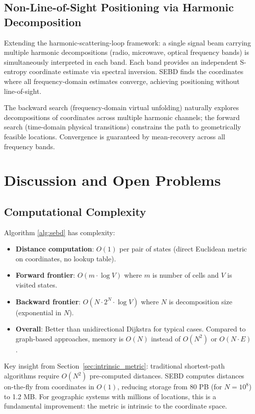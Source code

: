 \documentclass[twocolumn,11pt,a4paper]{article}
\begin{document}
\subsection{Non-Line-of-Sight Positioning via Harmonic Decomposition}

Extending the harmonic-scattering-loop framework: a single signal beam carrying multiple harmonic decompositions (radio, microwave, optical frequency bands) is simultaneously interpreted in each band. Each band provides an independent S-entropy coordinate estimate via spectral inversion. SEBD finds the coordinates where all frequency-domain estimates converge, achieving positioning without line-of-sight.

The backward search (frequency-domain virtual unfolding) naturally explores decompositions of coordinates across multiple harmonic channels; the forward search (time-domain physical transitions) constrains the path to geometrically feasible locations. Convergence is guaranteed by mean-recovery across all frequency bands.

\section{Discussion and Open Problems}
\label{sec:discussion}

\subsection{Computational Complexity}

Algorithm \ref{alg:sebd} has complexity:
\begin{itemize}[nosep,leftmargin=1em]
  \item \textbf{Distance computation}: $O(1)$ per pair of states (direct Euclidean metric on coordinates, no lookup table).
  \item \textbf{Forward frontier}: $O(m \cdot \log V)$ where $m$ is number of cells and $V$ is visited states.
  \item \textbf{Backward frontier}: $O(N \cdot 2^N \cdot \log V)$ where $N$ is decomposition size (exponential in $N$).
  \item \textbf{Overall}: Better than unidirectional Dijkstra for typical cases. Compared to graph-based approaches, memory is $O(N)$ instead of $O(N^2)$ or $O(N \cdot E)$.
\end{itemize}

Key insight from Section~\ref{sec:intrinsic_metric}: traditional shortest-path algorithms require $O(N^2)$ pre-computed distances. SEBD computes distances on-the-fly from coordinates in $O(1)$, reducing storage from 80 PB (for $N=10^8$) to 1.2 MB. For geographic systems with millions of locations, this is a fundamental improvement: the metric is intrinsic to the coordinate space.
\end{document}
